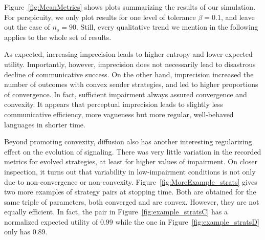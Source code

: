\documentclass[fleqn,reqno,10pt]{article}
\begin{document}
Figure~\ref{fig:MeanMetrics} shows plots summarizing the results of
our simulation. For perspicuity, we only plot results for one level of
tolerance $\beta = 0.1$, and leave out the case of $n_s = 90$. Still,
every qualitative trend we mention in the following applies to the
whole set of results.

As expected, increasing imprecision leads to higher entropy and lower
expected utility. Importantly, however, imprecision does not
necessarily lead to disastrous decline of communicative success. On
the other hand, imprecision increased the number of outcomes with
convex sender strategies, and led to higher proportions of
convergence. In fact, sufficient impairment always assured convergence
and convexity. It appears that perceptual imprecision leads to
slightly less communicative efficiency, more vagueness but more
regular, well-behaved languages in shorter time.

Beyond promoting convexity, diffusion also has another interesting
regularizing effect on the evolution of signaling. There was very
little variation in the recorded metrics for evolved strategies, at
least for higher values of impairment. On closer inspection, it turns
out that variability in low-impairment conditions is not only due to
non-convergence or non-convexity. Figure~\ref{fig:MoreExample_strats}
gives two more examples of strategy pairs at stopping time. Both are
obtained for the same triple of parameters, both converged and are
convex. However, they are not equally efficient. In fact, the pair in
Figure~\ref{fig:example_stratsC} has a normalized expected utility of
$0.99$ while the one in Figure~\ref{fig:example_stratsD} only has
$0.89$.
\end{document}
